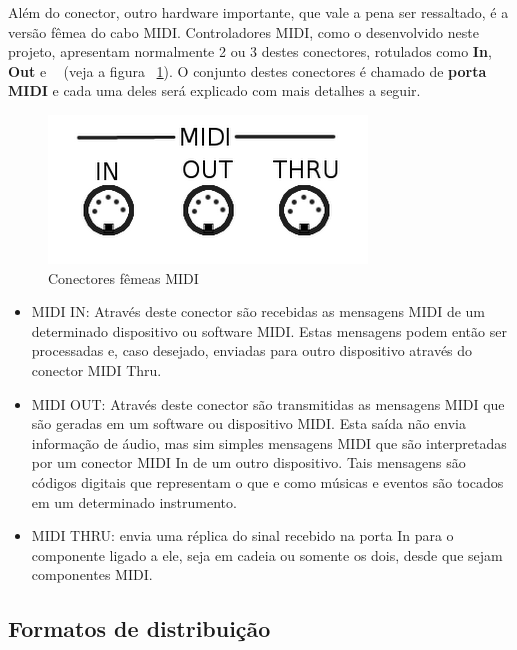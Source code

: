             Além do conector, outro hardware importante, que vale a pena ser ressaltado, é a versão fêmea do cabo MIDI. Controladores MIDI, como o desenvolvido neste projeto, apresentam normalmente 2 ou 3 destes conectores, rotulados como \textbf{In}, \textbf{Out} e \textbf{~} (veja a figura ~\ref{fig:MIDI_connector_Female}). O conjunto destes conectores é chamado de \textbf{porta MIDI} e cada uma deles será explicado com mais detalhes a seguir.

            \begin{figure}[H]
            	\centering
            	\includegraphics[scale=0.8]{Imagens/midi_in_out_thru.png}
            	\caption[Conectores fêmeas MIDI]{Conectores fêmeas MIDI}
            	\label{fig:MIDI_connector_Female}
            \end{figure}

            \begin{itemize}
                \item MIDI IN: Através deste conector são recebidas as mensagens MIDI de um determinado dispositivo ou software MIDI. Estas mensagens podem então ser processadas e, caso desejado, enviadas para outro dispositivo através do conector MIDI Thru.

                \item MIDI OUT: Através deste conector são transmitidas as mensagens MIDI que são geradas em um software ou dispositivo MIDI. Esta saída não envia informação de áudio, mas sim simples mensagens MIDI que são interpretadas por um conector MIDI In de um outro dispositivo. Tais mensagens são códigos digitais que representam o que e como músicas e eventos são tocados em um determinado instrumento.

                \item MIDI THRU: envia uma réplica do sinal recebido na porta In para o componente ligado a ele, seja em cadeia ou somente os dois, desde que sejam componentes MIDI.
            \end{itemize}

        \subsection{Formatos de distribuição}

